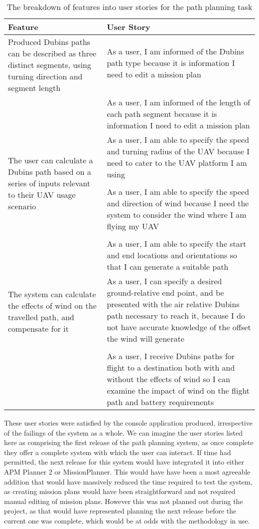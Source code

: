 \begin{table}[h!]
\centering
\caption{The breakdown of features into user stories for the path planning task\label{tab:task1planning}}
 \begin{tabular}{p{} | p{}}
	\hline
	\textbf{Feature} & \textbf{User Story} \\
	\hline
	\hline
	\multirow{2}{0.4\textwidth}{Produced Dubins paths can be described as three distinct segments, using turning direction and segment length} & As a user, I am informed of the Dubins path type because it is information I need to edit a mission plan \\
	\\
	& As a user, I am informed of the length of each path segment because it is information I need to edit a mission plan\\
	\hline
	\multirow{3}{0.4\textwidth}{The user can calculate a Dubins path based on a series of inputs relevant to their UAV usage scenario} & As a user, I am able to specify the speed and turning radius of the UAV because I need to cater to the UAV platform I am using\\
	\\
	& As a user, I am able to specify the speed and direction of wind because I need the system to consider the wind where I am flying my UAV\\
	\\
	& As a user, I am able to specify the start and end locations and orientations so that I can generate a suitable path\\
	\hline
	\multirow{2}{0.4\textwidth}{The system can calculate the effects of wind on the travelled path, and compensate for it} & As a user, I can specify a desired ground-relative end point, and be presented with the air relative Dubins path necessary to reach it, because I do not have accurate knowledge of the offset the wind will generate\\
	\\
	& As a user, I receive Dubins paths for flight to a destination both with and without the effects of wind so I can examine the impact of wind on the flight path and battery requirements\\
	\hline
 \end{tabular}
\end{table}

These user stories were satisfied by the console application produced, irrespective of the failings of the system as a whole. We can imagine the user stories listed here as comprising the first release of the path planning system, as once complete they offer a complete system with which the user can interact. If time had permitted, the next release for this system would have integrated it into either APM Planner 2 or MissionPlanner. This would have have been a most agreeable addition that would have massively reduced the time required to test the system, as creating mission plans would have been straightforward and not required manual editing of mission plans. However this was not planned out during the project, as that would have represented planning the next release before the current one was complete, which would be at odds with the methodology in use.

